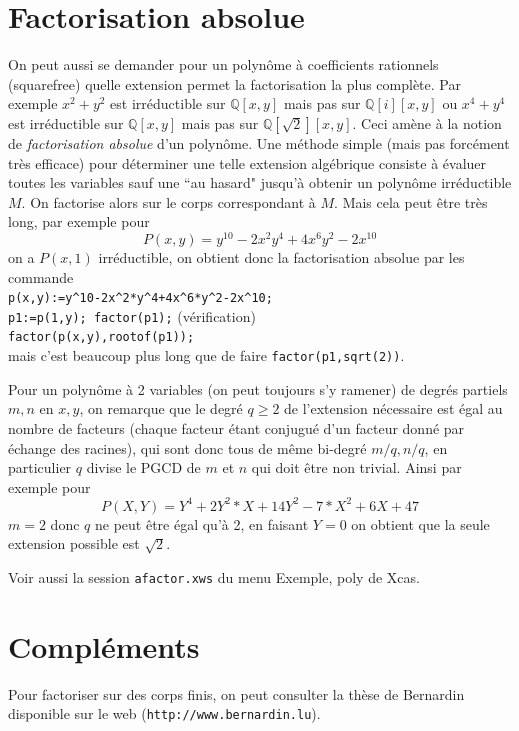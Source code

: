 \documentclass[a4paper,11pt]{book}
\begin{document}
\begin{giacjshere}
\section{Factorisation absolue} \label{sec:factorisation_absolue}
On peut aussi se demander pour un polyn\^ome \`a coefficients
rationnels (squarefree) quelle extension 
permet la factorisation la plus
compl\`ete. Par exemple $x^2+y^2$ est irr\'eductible sur $\mathbb{Q}[x,y]$
mais pas sur $\mathbb{Q}[i][x,y]$ ou $x^4+y^4$ est irr\'eductible sur $\mathbb{Q}[x,y]$
mais pas sur $\mathbb{Q}[\sqrt{2}][x,y]$. Ceci am\`ene \`a la notion
de {\em factorisation absolue} d'un polyn\^ome. Une m\'ethode simple
(mais pas forc\'ement tr\`es efficace) pour d\'eterminer une telle
extension alg\'ebrique consiste \`a \'evaluer toutes les variables
sauf une ``au hasard" jusqu'\`a obtenir un polyn\^ome irr\'eductible $M$.
On factorise alors sur le corps correspondant \`a $M$. Mais cela
peut \^etre tr\`es long, par exemple pour 
\[ P(x,y)=y^{10}-2x^2y^4+4x^6y^2-2x^{10}\]
on a $P(x,1)$ irr\'eductible, on obtient donc la factorisation
absolue par les commande\\
\verb|p(x,y):=y^10-2x^2*y^4+4x^6*y^2-2x^10;|\\
\verb|p1:=p(1,y); factor(p1);| (v\'erification)\\
\verb|factor(p(x,y),rootof(p1));|\\
mais c'est beaucoup plus long que de faire \verb|factor(p1,sqrt(2))|.

Pour un polyn\^ome \`a 2 variables (on peut toujours s'y ramener) de
degr\'es partiels $m,n$ en $x,y$,
on remarque que le degr\'e $q \geq 2$ de l'extension n\'ecessaire est
\'egal au nombre de facteurs (chaque facteur \'etant conjugu\'e d'un
facteur donn\'e par \'echange des racines), qui sont donc tous de m\^eme
bi-degr\'e $m/q,n/q$, en particulier $q$ divise le PGCD de $m$ et $n$
qui doit \^etre non trivial. Ainsi par exemple pour 
$$ P(X,Y)=Y^4 +2Y^2*X+14Y^2 -7*X^2 +6X+47$$
$m=2$ donc $q$ ne peut \^etre \'egal qu'\`a 2, en faisant $Y=0$ on
obtient que la seule extension possible est $\sqrt{2}$.

Voir aussi la session \verb|afactor.xws| du menu Exemple, poly de Xcas.

\section{Compl\'ements}
Pour factoriser sur des corps finis, on peut consulter la thèse
de Bernardin disponible sur le web (\verb|http://www.bernardin.lu|).


\end{giacjshere}
\end{document}
